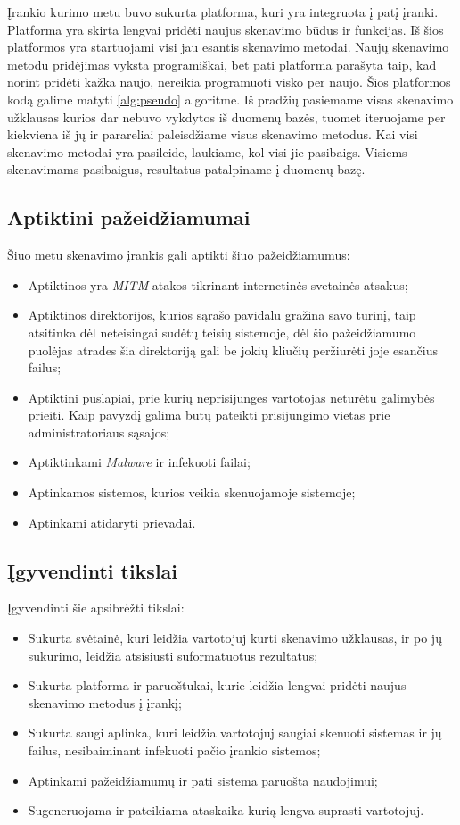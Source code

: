 \documentclass[a4paper,12pt,fleqn]{article}
\begin{document}
Įrankio kurimo metu buvo sukurta platforma, kuri yra integruota į patį įranki. Platforma yra skirta lengvai pridėti naujus skenavimo būdus ir funkcijas. Iš šios platformos yra startuojami visi jau esantis skenavimo metodai. Naujų skenavimo metodu pridėjimas vyksta programiškai, bet pati platforma parašyta taip, kad norint pridėti kažka naujo, nereikia programuoti visko per naujo. Šios platformos kodą galime matyti \ref{alg:pseudo} algoritme. Iš pradžių pasiemame visas skenavimo užklausas kurios dar nebuvo vykdytos iš duomenų bazės, tuomet iteruojame per kiekviena iš jų ir parareliai paleisdžiame visus skenavimo metodus. Kai visi skenavimo metodai yra pasileide, laukiame, kol visi jie pasibaigs. Visiems skenavimams pasibaigus, resultatus patalpiname į duomenų bazę.


\subsection{Aptiktini pažeidžiamumai}

Šiuo metu skenavimo įrankis gali aptikti šiuo pažeidžiamumus:
\begin{itemize}
	\item Aptiktinos yra \textit{MITM} atakos tikrinant internetinės svetainės atsakus;
	\item Aptiktinos direktorijos, kurios sąrašo pavidalu gražina savo turinį, taip atsitinka dėl neteisingai sudėtų teisių sistemoje, dėl šio pažeidžiamumo puolėjas atrades šia direktoriją gali be jokių kliučių peržiurėti joje esančius failus;
	\item Aptiktini puslapiai, prie kurių neprisijunges vartotojas neturėtu galimybės prieiti. Kaip pavyzdį galima būtų pateikti prisijungimo vietas prie administratoriaus sąsajos;
	\item Aptiktinkami \textit{Malware} ir infekuoti failai;
	\item Aptinkamos sistemos, kurios veikia skenuojamoje sistemoje;
	\item Aptinkami atidaryti prievadai.
\end{itemize}

\subsection{Įgyvendinti tikslai}
\label{sec:example}
Įgyvendinti šie apsibrėžti tikslai: 
\begin{itemize}
	\item Sukurta svėtainė, kuri leidžia vartotojuj kurti skenavimo užklausas, ir po jų sukurimo, leidžia atsisiusti suformatuotus rezultatus;
	\item Sukurta platforma ir paruoštukai, kurie leidžia lengvai pridėti naujus skenavimo metodus į įrankį;
	\item Sukurta saugi aplinka, kuri leidžia vartotojuj saugiai skenuoti sistemas ir jų failus, nesibaiminant infekuoti pačio įrankio sistemos;
	\item Aptinkami pažeidžiamumų ir pati sistema paruošta naudojimui;
	\item Sugeneruojama ir pateikiama ataskaika kurią lengva suprasti vartotojuj.
\end{itemize}
\end{document}
